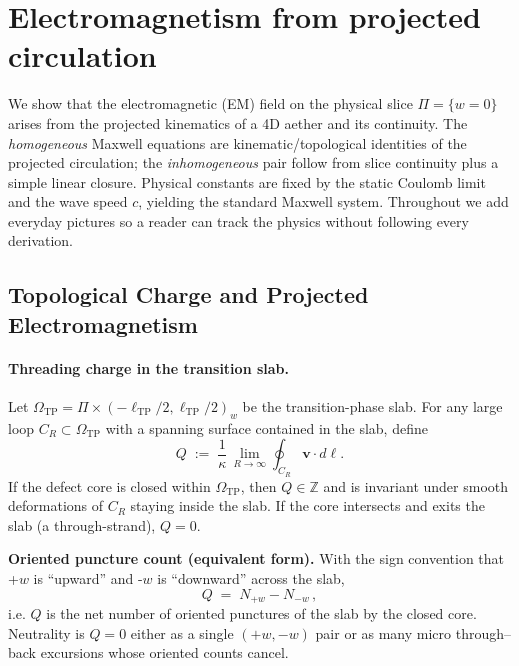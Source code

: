 \section{Electromagnetism from projected circulation}
\label{sec:EM_projection}

We show that the electromagnetic (EM) field on the physical slice $\Pi=\{w=0\}$ arises from the projected kinematics of a 4D aether and its continuity. The \emph{homogeneous} Maxwell equations are kinematic/topological identities of the projected circulation; the \emph{inhomogeneous} pair follow from slice continuity plus a simple linear closure. Physical constants are fixed by the static Coulomb limit and the wave speed $c$, yielding the standard Maxwell system. Throughout we add everyday pictures so a reader can track the physics without following every derivation.

\subsection{Topological Charge and Projected Electromagnetism}
\label{sec:projected-em:charge}

\paragraph{Threading charge in the transition slab.}
Let $\Omega_{\mathrm{TP}}=\Pi\times(-\ell_{\mathrm{TP}}/2,\ell_{\mathrm{TP}}/2)_w$ be the transition-phase slab.
For any large loop $C_R\subset\Omega_{\mathrm{TP}}$ with a spanning surface contained in the slab, define
\begin{equation}
\label{eq:Q-threading}
Q \;:=\; \frac{1}{\kappa}\,\lim_{R\to\infty}\oint_{C_R}\mathbf v\cdot d\boldsymbol\ell.
\end{equation}
If the defect core is closed within $\Omega_{\mathrm{TP}}$, then $Q\in\mathbb Z$ and is invariant under smooth deformations of $C_R$ staying inside the slab. If the core intersects and exits the slab (a through-strand), $Q=0$.

\noindent\textbf{Oriented puncture count (equivalent form).}
With the sign convention that +$w$ is ``upward'' and -$w$ is ``downward'' across the slab,
\begin{equation}
Q \;=\; N_{+w}-N_{-w}\,,
\label{eq:Q-oriented-count}
\end{equation}
i.e. $Q$ is the net number of oriented punctures of the slab by the closed core. Neutrality is $Q{=}0$ either as a single $(+w,-w)$ pair or as many micro through--back excursions whose oriented counts cancel.

